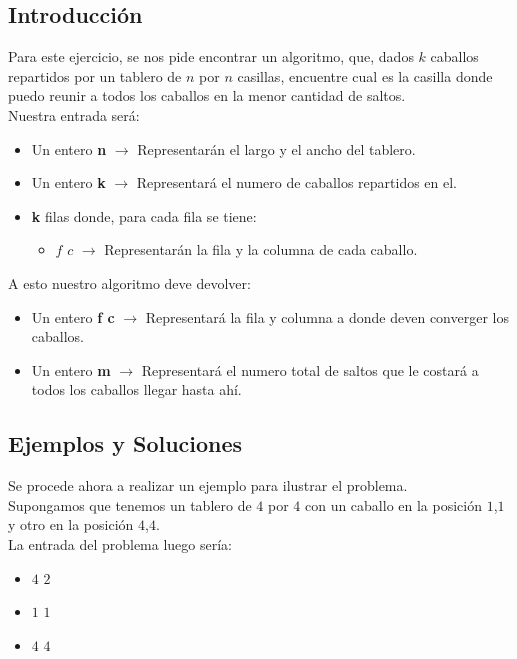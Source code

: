 \subsection{Introducci\'on} 
Para este ejercicio, se nos pide encontrar un algoritmo, que, dados $k$ caballos repartidos por un tablero de $n$ por $n$ casillas, encuentre cual es la casilla donde puedo reunir a todos los caballos en la menor cantidad de saltos.
\\
Nuestra entrada ser\'a:
\\
\begin{itemize}
\item Un entero \textbf{n} $\rightarrow$ Representar\'an el largo y el ancho del tablero.
\item Un entero \textbf{k} $\rightarrow$ Representar\'a el numero de caballos repartidos en el.
\item \textbf{k} filas donde, para cada fila se tiene:
\begin{itemize}
\item $f$ $c$ $\rightarrow$ Representar\'an la fila y la columna de cada caballo.
\end{itemize}
\end{itemize}
A esto nuestro algoritmo deve devolver:
\begin{itemize}
\item Un entero \textbf{f c} $\rightarrow$ Representar\'a la fila y columna a donde deven converger los caballos.
\item Un entero \textbf{m} $\rightarrow$ Representar\'a el numero total de saltos que le costar\'a a todos los caballos llegar hasta ah\'i.
\end{itemize}

\subsection{Ejemplos y Soluciones}
Se procede ahora a realizar un ejemplo para ilustrar el problema.
\\
Supongamos que tenemos un tablero de $4$ por $4$ con un caballo en la posici\'on $1$,$1$ y otro en la posici\'on $4$,$4$.
\\
La entrada del problema luego ser\'ia:
\\
\begin{itemize}
\item $4$ $2$ 
\item $1$ $1$
\item $4$ $4$
\end{itemize}

